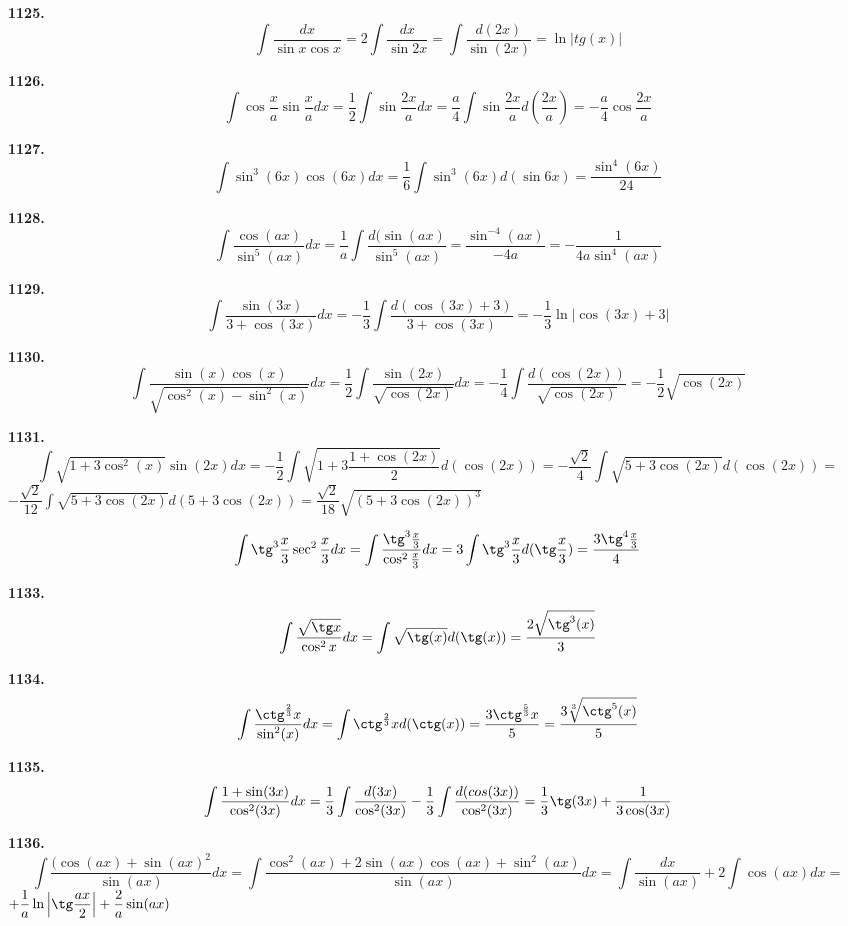 \documentclass[12pt]{article}
\begin{document}
	{\bf 1125.} \[
		\int\dfrac{dx}{\sin x\cos x} = 2\int \dfrac{dx}{\sin2x} = \int \dfrac{d(2x)}{\sin (2x)} = \ln|tg(x)|
	\]
	
	{\bf 1126.} \[
		\int\cos\frac{x}{a}\sin\frac{x}{a}dx = \dfrac{1}{2}\int \sin\frac{2x}{a}dx = \dfrac{a}{4}\int \sin\dfrac{2x}{a}d\left(\dfrac{2x}{a}\right) = -\dfrac{a}{4}\cos\dfrac{2x}{a}
	\]
	
	{\bf 1127.} \[
		\int \sin^3 (6x) \cos (6x) d x = \dfrac{1}{6}\int \sin^3 (6x)d(\sin 6x) = \dfrac{\sin^4 (6x)}{24}
	\]
	
	{\bf 1128.} \[
		\int \dfrac{\cos(ax)}{\sin^5(ax)}dx = \dfrac{1}{a}\int \dfrac{d(\sin(ax)}{\sin^5(ax)} = \dfrac{\sin^{-4}(ax)}{-4a} = -\dfrac{1}{4a\sin^4(ax)}
	\]
	
	{\bf 1129.} \[
		\int \dfrac{\sin(3x)}{3+\cos(3x)}dx = -\dfrac{1}{3}\int \dfrac{d(\cos(3x)+3)}{3+\cos(3x)} = -\dfrac{1}{3}\ln|\cos(3x)+3|
	\]
	
	{\bf 1130.} \[
		\int \dfrac{\sin(x)\cos(x)}{\sqrt{\cos^2(x)-\sin^2(x)}}dx = \dfrac{1}{2}\int \dfrac{\sin(2x)}{\sqrt{\cos(2x)}}dx = -\dfrac{1}{4}\int \dfrac{d(\cos(2x))}{\sqrt{\cos(2x)}} = -\dfrac{1}{2}\sqrt{\cos(2x)}
	\]
	
	{\bf 1131.} \[
		\int\sqrt{1+3\cos^2(x)}\sin(2x)dx = -\dfrac{1}{2}\int \sqrt{1+3\dfrac{1+\cos(2x)}{2}}d(\cos(2x)) = -\dfrac{\sqrt{2}}{4}\int \sqrt{5+3\cos(2x)}d(\cos(2x)) = 
	\]
	$
	-\dfrac{\sqrt{2}}{12}\int \sqrt{5+3\cos(2x)}d(5+3\cos(2x)) = \dfrac{\sqrt{2}}{18}\sqrt{(5+3\cos(2x))^3}
	$
	
	\[
		\int \tg^3\frac{x}{3}\sec^2\frac{x}{3}dx = \int \dfrac{\tg^3\frac{x}{3}}{\cos^2\frac{x}{3}}dx = 3\int \tg^3\frac{x}{3}d(\tg\frac{x}{3}) = \dfrac{3\tg^4\frac{x}{3}}{4}
	\]
	
	{\bf 1133.} \[
		\int \dfrac{\sqrt{\tg x}}{\cos^2 x}dx = \int \sqrt{\tg(x)}d(\tg(x)) = \dfrac{2\sqrt{\tg^3(x)}}{3}
	\]
	
	{\bf 1134.} \[
		\int \dfrac{\ctg^\frac{2}{3} x}{\sin^2(x)}dx = \int \ctg^\frac{2}{3} x d(\ctg(x)) = \dfrac{3\ctg^\frac{5}{3}x}{5} = \dfrac{3\sqrt[3]{\ctg^5(x)}}{5}
	\]
	
	{\bf 1135.} \[
		\int \dfrac{1+\sin(3x)}{\cos^2(3x)}dx = \dfrac{1}{3}\int \dfrac{d(3x)}{\cos^2(3x)} - \dfrac{1}{3}\int \dfrac{d(cos(3x))}{\cos^2(3x)} = \dfrac{1}{3}\tg(3x) + \dfrac{1}{3\cos(3x)}
	\]
	
	{\bf 1136.} \[
		\int \dfrac{(\cos(ax)+\sin(ax)^2}{\sin(ax)}dx = \int \dfrac{\cos^2(ax)+2\sin(ax)\cos(ax)+\sin^2(ax)}{\sin(ax)}dx = \int \dfrac{dx}{\sin(ax)} + 2\int \cos(ax)dx = 
	\]
	$
	+\dfrac{1}{a}\ln\left|\tg\dfrac{ax}{2}\right| + \dfrac{2}{a} \sin(ax)
	$
	
\end{document}
